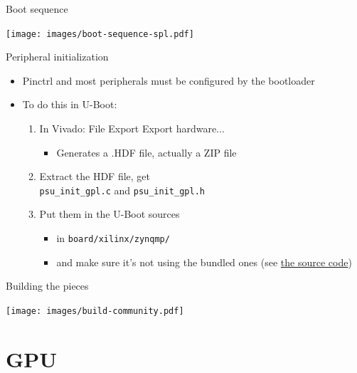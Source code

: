 \documentclass[xetex,table]{beamer}
\begin{document}
\begin{frame}{Boot sequence}
  \begin{center}
    \texttt{[image: images/boot-sequence-spl.pdf]}
  \end{center}
\end{frame}

\begin{frame}{Peripheral initialization}
  \begin{itemize}
  \item Pinctrl and most peripherals must be configured by the
    bootloader
  \item To do this in U-Boot:
    \begin{enumerate}
    \item In Vivado: File \textrightarrow{} Export \textrightarrow{}
      Export hardware...
      \begin{itemize}
      \item Generates a .HDF file, actually a ZIP file
      \end{itemize}
    \item Extract the HDF file, get\\
      {\tt psu\_init\_gpl.c} and {\tt psu\_init\_gpl.h}
    \item Put them in the U-Boot sources
      \begin{itemize}
      \item in {\tt board/xilinx/zynqmp/}
      \item and make sure it's not using the bundled ones (see
        \href{https://github.com/xilinx/u-boot-xlnx/tree/a703fb6e3c6c5a7f57321e258a58d241e2afdc45/board/xilinx/zynqmp}{the
          source code})
      \end{itemize}
    \end{enumerate}
  \end{itemize}
\end{frame}

\begin{frame}{Building the pieces}
  \begin{center}
    \texttt{[image: images/build-community.pdf]}
  \end{center}
\end{frame}

\section{GPU}
\end{document}
